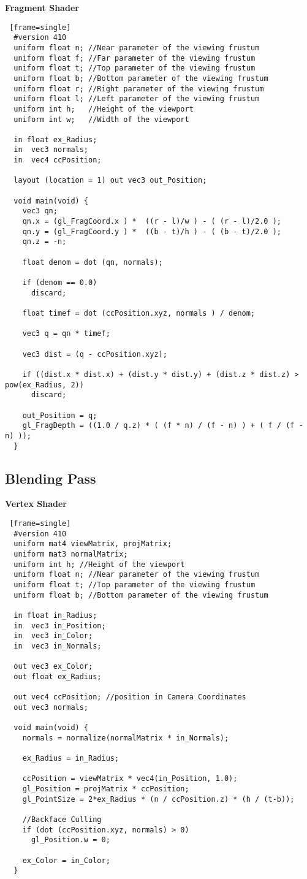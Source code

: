 \textbf{Fragment Shader}
\begin{lstlisting} [frame=single]
  #version 410
  uniform float n; //Near parameter of the viewing frustum
  uniform float f; //Far parameter of the viewing frustum
  uniform float t; //Top parameter of the viewing frustum
  uniform float b; //Bottom parameter of the viewing frustum
  uniform float r; //Right parameter of the viewing frustum
  uniform float l; //Left parameter of the viewing frustum
  uniform int h;   //Height of the viewport
  uniform int w;   //Width of the viewport

  in float ex_Radius;
  in  vec3 normals;
  in  vec4 ccPosition;

  layout (location = 1) out vec3 out_Position;

  void main(void) {
    vec3 qn;
    qn.x = (gl_FragCoord.x ) *  ((r - l)/w ) - ( (r - l)/2.0 );
    qn.y = (gl_FragCoord.y ) *  ((b - t)/h ) - ( (b - t)/2.0 );
    qn.z = -n;

    float denom = dot (qn, normals);

    if (denom == 0.0)
      discard;

    float timef = dot (ccPosition.xyz, normals ) / denom;

    vec3 q = qn * timef;

    vec3 dist = (q - ccPosition.xyz);

    if ((dist.x * dist.x) + (dist.y * dist.y) + (dist.z * dist.z) > pow(ex_Radius, 2))
      discard;

    out_Position = q;
    gl_FragDepth = ((1.0 / q.z) * ( (f * n) / (f - n) ) + ( f / (f - n) ));
  }
\end{lstlisting}
\newpage

\subsection{Blending Pass}
\textbf{Vertex Shader}
\begin{lstlisting} [frame=single]
  #version 410
  uniform mat4 viewMatrix, projMatrix;
  uniform mat3 normalMatrix;
  uniform int h; //Height of the viewport
  uniform float n; //Near parameter of the viewing frustum
  uniform float t; //Top parameter of the viewing frustum
  uniform float b; //Bottom parameter of the viewing frustum

  in float in_Radius;
  in  vec3 in_Position;
  in  vec3 in_Color;
  in  vec3 in_Normals;

  out vec3 ex_Color;
  out float ex_Radius;

  out vec4 ccPosition; //position in Camera Coordinates
  out vec3 normals;

  void main(void) {
    normals = normalize(normalMatrix * in_Normals);

    ex_Radius = in_Radius;

    ccPosition = viewMatrix * vec4(in_Position, 1.0);
    gl_Position = projMatrix * ccPosition;
    gl_PointSize = 2*ex_Radius * (n / ccPosition.z) * (h / (t-b));

    //Backface Culling
    if (dot (ccPosition.xyz, normals) > 0)
      gl_Position.w = 0;

    ex_Color = in_Color;
  }
\end{lstlisting}
\newpage

